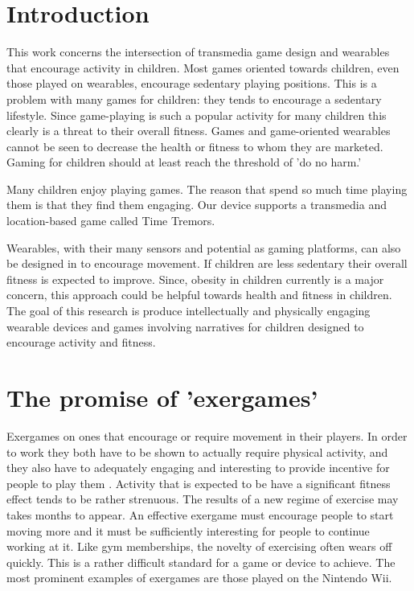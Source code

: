 \documentclass{SIGCHI2015LaTex/sigchi}
\begin{document}


\section{Introduction}
This work concerns the intersection of transmedia game design and wearables that encourage activity in children. Most games oriented towards children, even those played on wearables, encourage sedentary playing positions. This is a problem with many games for children: they tends to encourage a sedentary lifestyle. Since game-playing is such a popular activity for many children this clearly is a threat to their overall fitness. Games and game-oriented wearables cannot be seen to decrease the health or fitness to whom they are marketed. Gaming for children should at least reach the threshold of 'do no harm.'

Many children enjoy playing games. The reason that spend so much time playing them is that they find them engaging. Our device supports a transmedia and location-based game called Time Tremors. 

Wearables, with their many sensors and potential as gaming platforms, can also be designed in to encourage movement. If children are less sedentary their overall fitness is expected to improve. Since, obesity in children currently is a major concern, this approach could be helpful towards health and fitness in children. The goal of this research is produce intellectually and physically engaging wearable devices and games involving narratives for children designed to encourage activity and fitness. 

\section{The promise of 'exergames'}
Exergames on ones that encourage or require movement in their players. In order to work they both have to be shown to actually require physical activity, and they also have to adequately engaging and interesting to provide incentive for people to play them \cite{whitehead2010exergame}. Activity that is expected to be have a significant fitness effect tends to be rather strenuous. The results of a new regime of exercise may takes months to appear. An effective exergame must encourage people to start moving more and it must be sufficiently interesting for people to continue working at it. Like gym memberships, the novelty of exercising often wears off quickly. This is a rather difficult standard for a game or device to achieve. The most prominent examples of exergames are those played on the Nintendo Wii. 
\end{document}
